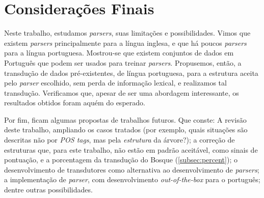 \chapter{Considerações Finais}
\label{chap:considFinal}
Neste trabalho, estudamos \textit{parsers}, suas limitações e possibilidades. Vimos que existem \textit{parsers} principalmente para a língua inglesa, e que há poucos \textit{parsers} para a língua portuguesa. Mostrou-se que existem conjuntos de dados em Português que podem ser usados para treinar \textit{parsers}. Propusemos, então, a transdução de dados pré-existentes, de língua portuguesa, para a estrutura aceita pelo \textit{parser} escolhido, sem perda de informação lexical, e realizamos tal transdução. Verificamos que, apesar de ser uma abordagem interessante, 
os resultados obtidos foram aquém do esperado.

Por fim, ficam algumas propostas de trabalhos futuros. Que conste:
A revisão deste trabalho, ampliando os casos tratados (por exemplo, quais situações são descritas não por \textit{POS tags}, mas pela \textit{estrutura} da árvore?);
a correção de estruturas que, para este trabalho, não estão em padrão aceitável, como sinais de pontuação, e a porcentagem da transdução do Bosque (\ref{subsec:percent});
o desenvolvimento de transdutores como alternativa ao desenvolvimento de \textit{parsers};
a implementação de \textit{parser}, com desenvolvimento \textit{out-of-the-box} para o português; 
dentre outras possibilidades. 